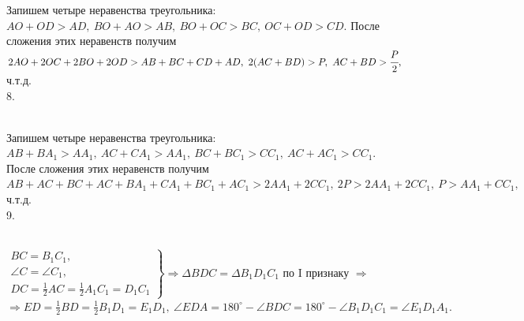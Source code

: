 \documentclass[12pt]{article}
\begin{document}
Запишем четыре неравенства треугольника: $AO+OD>AD,\ BO+AO>AB,\ BO+OC>BC,\ OC+OD>CD.$ После сложения этих неравенств получим $2AO+2OC+2BO+2OD>AB+BC+CD+AD,\ 2(AC+BD)>P,\ AC+BD>\cfrac{P}{2},$ ч.т.д.\\
8. \begin{figure}[ht!]
\end{figure}\\
Запишем четыре неравенства треугольника: $AB+BA_1>AA_1,\ AC+CA_1>AA_1,\ BC+BC_1>CC_1,\ AC+AC_1>CC_1.$ После сложения этих неравенств получим
$AB+AC+BC+AC+BA_1+CA_1+BC_1+AC_1>2AA_1+2CC_1,\ 2P>2AA_1+2CC_1,\ P>AA_1+CC_1,$ ч.т.д.\\
9. \begin{figure}[ht!]
\end{figure}\\
$\left.\begin{array}{l}BC=B_1C_1,\\
\angle C=\angle C_1,\\
DC=\frac{1}{2}AC=\frac{1}{2}A_1C_1=D_1C_1  \end{array}\right\}\Rightarrow
\Delta BDC=\Delta B_1D_1C_1\text{ по I признаку }\Rightarrow $\\$\Rightarrow ED=\frac{1}{2}BD=\frac{1}{2}B_1D_1=E_1D_1,\ \angle EDA=180^\circ-\angle BDC=180^\circ-\angle B_1D_1C_1=\angle E_1D_1A_1.$\\
\end{document}
